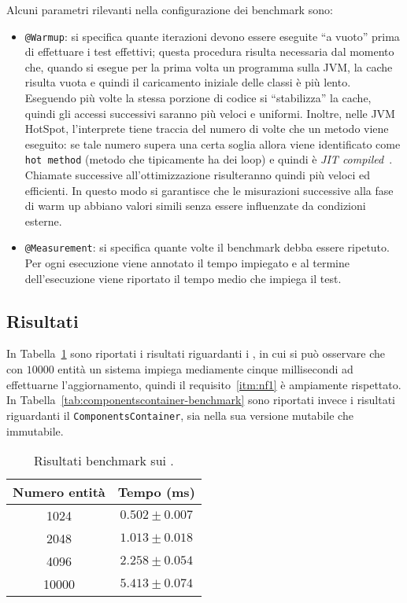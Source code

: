 Alcuni parametri rilevanti nella configurazione dei benchmark sono:
\begin{itemize}
    \item \texttt{@Warmup}: si specifica quante iterazioni devono essere eseguite ``a vuoto'' prima di effettuare i
    test effettivi;
    questa procedura risulta necessaria dal momento che, quando si esegue per la prima volta un programma sulla JVM, la
    cache risulta vuota e quindi il caricamento iniziale delle classi è più lento.
    Eseguendo più volte la stessa porzione di codice si ``stabilizza'' la cache, quindi gli accessi successivi saranno
    più veloci e uniformi.
    Inoltre, nelle JVM HotSpot, l'interprete tiene traccia del numero di volte che un metodo viene eseguito: se tale
    numero supera una certa soglia allora viene identificato come \texttt{hot method} (metodo che tipicamente ha dei
    loop) e quindi è \textit{JIT compiled}~\cite{jmh:details}.
    Chiamate successive all'ottimizzazione risulteranno quindi più veloci ed efficienti.
    In questo modo si garantisce che le misurazioni successive alla fase di warm up abbiano valori simili senza essere
    influenzate da condizioni esterne.
    \item \texttt{@Measurement}: si specifica quante volte il benchmark debba essere ripetuto.
    Per ogni esecuzione viene annotato il tempo impiegato e al termine dell'esecuzione viene riportato il tempo medio
    che impiega il test.
\end{itemize}

\subsection{Risultati}\label{subsec:risultati}
In Tabella~\ref{tab:system-benchmark} sono riportati i risultati riguardanti i \System, in cui si può osservare che con
$10000$ entità un sistema impiega mediamente cinque millisecondi ad effettuarne l'aggiornamento, quindi il requisito~\ref{itm:nf1}
è ampiamente rispettato.
In Tabella~\ref{tab:componentscontainer-benchmark} sono riportati invece i risultati riguardanti il
\texttt{ComponentsContainer}, sia nella sua versione mutabile che immutabile.

\begin{table}[htp]
    \centering
    \begin{tabular}{c c}
        \toprule
        Numero entità & Tempo (ms) \\ \midrule
        1024 & $0.502 \pm 0.007$ \\
        2048 & $1.013 \pm 0.018$ \\
        4096 & $2.258 \pm 0.054$ \\
        10000 & $5.413 \pm 0.074$ \\
        \bottomrule
    \end{tabular}
    \caption{Risultati benchmark sui \System.}\label{tab:system-benchmark}
\end{table}

